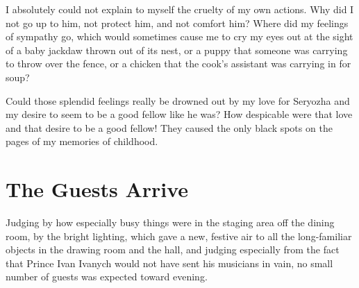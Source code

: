 I absolutely could not explain to myself the cruelty of my own actions. Why did I not go up to him, not protect him, and not comfort him? Where did my feelings of sympathy go, which would sometimes cause me to cry my eyes out at the sight of a baby jackdaw thrown out of its nest, or a puppy that someone was carrying to throw over the fence, or a chicken that the cook's assistant was carrying in for soup?

Could those splendid feelings really be drowned out by my love for Seryozha and my desire to seem to be a good fellow like he was? How despicable were that love and that desire to be a good fellow! They caused the only black spots on the pages of my memories of childhood.

\chapter{The Guests Arrive} %

Judging by how especially busy things were in the staging area off the dining room, by the bright lighting, which gave a new, festive air to all the long-familiar objects in the drawing room and the hall, and judging especially from the fact that Prince Ivan Ivanych would not have sent his musicians in vain, no small number of guests was expected toward evening.

